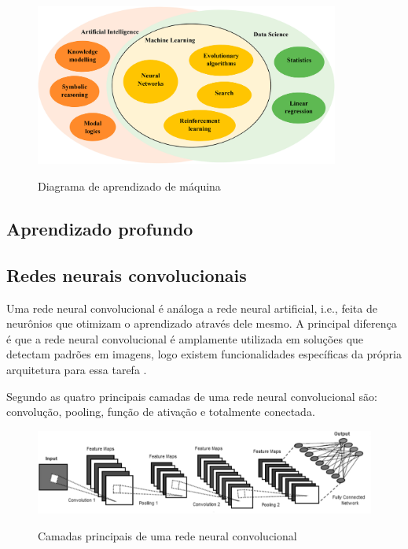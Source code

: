 \documentclass[
	12pt,				%
	openright,			%
	twoside,			%
	a4paper,			%
	english,			%
	french,				%
	spanish,			%
	brazil				%
	]{abntex2}
\begin{document}
\begin{figure}[H]
	\caption{Diagrama de aprendizado de máquina}
	\centering %
	\includegraphics[width=10cm]{figures/diagrama_ia.jpg} %
	\label{fig:diagrama_ia}
\end{figure}

\subsection{Aprendizado profundo}

\subsection{Redes neurais convolucionais}
Uma rede neural convolucional é análoga a rede neural artificial, i.e., feita de neurônios que otimizam o aprendizado através dele mesmo. A principal diferença é que a rede neural convolucional é amplamente utilizada em soluções que detectam padrões em imagens, logo existem funcionalidades específicas da própria arquitetura para essa tarefa \cite{oshea2015introduction}.

Segundo  as quatro principais camadas de uma rede neural convolucional são: convolução, pooling, função de ativação e totalmente conectada.

\begin{figure}[H]
	\caption{Camadas principais de uma rede neural convolucional}
	\centering %
	\includegraphics[width=15cm]{figures/arquitetura_cnn.png} %
	\label{fig:fluxo_cnn}
\end{figure}
\end{document}
